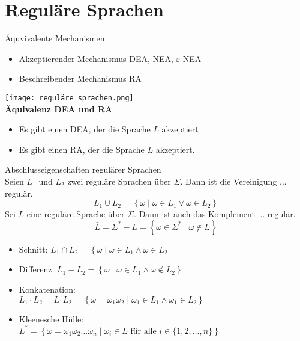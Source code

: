 \graphicspath{{images/}}
\section*{Reguläre Sprachen}

\begin{concept}{Äquvivalente Mechanismen}\\
    \begin{itemize}
        \item Akzeptierender Mechanismus DEA, NEA, $\varepsilon$-NEA
        \item Beschreibender Mechanismus RA
    \end{itemize}
      \texttt{[image: reguläre\_sprachen.png]}\\
    \textbf{Äquivalenz DEA und RA}
    \begin{itemize}
    \item Es gibt einen DEA, der die Sprache $L$ akzeptiert
    \item Es gibt einen RA, der die Sprache $L$ akzeptiert.
    \end{itemize}
\end{concept}

\begin{theorem}{Abschlusseigenschaften regulärer Sprachen}\\
    Seien $L_{1}$ und $L_{2}$ zwei reguläre Sprachen über $\Sigma$. Dann ist die Vereinigung ... regulär.
    $$
    L_{1} \cup L_{2}=\left\{\omega \mid \omega \in L_{1} \vee \omega \in L_{2}\right\}
    $$
    Sei $L$ eine reguläre Sprache über $\Sigma$. Dann ist auch das Komplement ... regulär.
    $$
    \bar{L}=\Sigma^{*}-L=\left\{\omega \in \Sigma^{*} \mid \omega \notin L\right\}
    $$
    \begin{itemize}
        \item Schnitt: $L_{1} \cap L_{2}=\left\{\omega \mid \omega \in L_{1} \wedge \omega \in L_{2}\right.$
        \item Differenz: $L_{1}-L_{2}=\left\{\omega \mid \omega \in L_{1} \wedge \omega \notin L_{2}\right\}$
        \item Konkatenation:\\
        $L_{1} \cdot L_{2}=L_{1} L_{2}=\left\{\omega=\omega_{1} \omega_{2} \mid \omega_{1} \in L_{1} \wedge \omega_{1} \in L_{2}\right\}$
        \item Kleenesche Hülle:\\ 
        $L^{*}=\left\{\omega=\omega_{1} \omega_{2} \ldots \omega_{n} \mid \omega_{i} \in L \text { für alle } i \in\{1,2, \ldots, n\}\right\}$
    \end{itemize}
\end{theorem}

